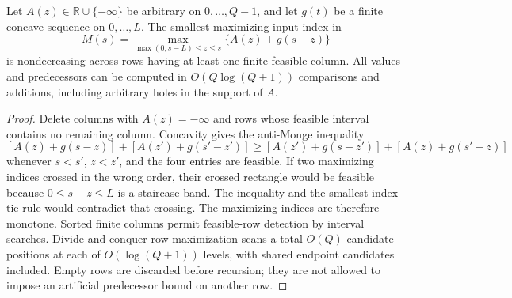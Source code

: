 \begin{lemma}\label{lem:holes56}
Let $A(z)\in\mathbb R\cup\{-\infty\}$ be arbitrary on $0,\ldots,Q-1$, and let $g(t)$ be a finite concave sequence on $0,\ldots,L$. The smallest maximizing input index in
\[
 M(s)=\max_{\max(0,s-L)\leq z\leq s}\{A(z)+g(s-z)\}
\]
is nondecreasing across rows having at least one finite feasible column. All values and predecessors can be computed in $O(Q\log(Q+1))$ comparisons and additions, including arbitrary holes in the support of $A$.
\end{lemma}
\begin{proof}
Delete columns with $A(z)=-\infty$ and rows whose feasible interval contains no remaining column. Concavity gives the anti-Monge inequality
\[
 [A(z)+g(s-z)]+[A(z')+g(s'-z')]
 \geq[A(z')+g(s-z')]+[A(z)+g(s'-z)]
\]
whenever $s<s'$, $z<z'$, and the four entries are feasible. If two maximizing indices crossed in the wrong order, their crossed rectangle would be feasible because $0\leq s-z\leq L$ is a staircase band. The inequality and the smallest-index tie rule would contradict that crossing. The maximizing indices are therefore monotone. Sorted finite columns permit feasible-row detection by interval searches. Divide-and-conquer row maximization scans a total $O(Q)$ candidate positions at each of $O(\log(Q+1))$ levels, with shared endpoint candidates included. Empty rows are discarded before recursion; they are not allowed to impose an artificial predecessor bound on another row.
\end{proof}

